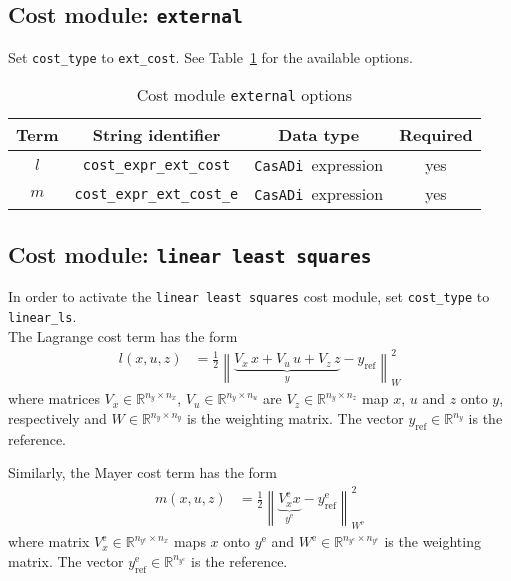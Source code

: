 \documentclass[english]{article}
\newcommand{\code}[1]{\texttt{#1}}
\newcommand{\casadi}{\texttt{CasADi}}
\newcommand{\norm}[1]{\left\lVert#1\right\rVert}
\newcommand{\ind}[1]{_{\textrm{#1}}}
\newcommand{\terminal}{^{\textrm{e}}}
\newcommand{\mandatory}{yes}
\begin{document}
\subsection{Cost module: \code{external}}\label{sec:cost:external}
%
Set \code{cost\_type} to \code{ext\_cost}. %
See Table~\ref{tab:cost:external} for the available options.
\begin{table}[ht!]
    \centering
    \caption{Cost module \code{external} options} \label{tab:cost:external}
    \begin{tabular}{cccc}
        \toprule
        Term & String identifier & Data type & Required \\ \midrule
        $ l $ & \code{cost\_expr\_ext\_cost}    & \casadi~expression   & \mandatory  \\
        $ m $ & \code{cost\_expr\_ext\_cost\_e}    & \casadi~expression  & \mandatory \\
        \bottomrule
    \end{tabular}
\end{table}
%
\subsection{Cost module: \code{linear least squares}}\label{sec:cost:linear_ls}
%
In order to activate the \code{linear least squares} cost module, set \code{cost\_type} to \code{linear\_ls}.\\
The Lagrange cost term has the form
\begin{align}
l(x, u, z) &= \frac{1}{2} \norm{ \underbrace{V_x\, x + V_u\, u + V_z\, z}_{\displaystyle y} - y\ind{ref}}_W^2 \label{eq:cost:linear_ls:l}
\end{align}
where matrices $ V_x \in \mathbb{R}^{n_y \times n_x}$, $V_u \in \mathbb{R}^{n_y \times n_u}$ are $V_z \in \mathbb{R}^{n_y \times n_z}$ map $x$, $u$ and $z$ onto $y$, respectively and $W \in \mathbb{R}^{n_y \times n_y}$ is the weighting matrix.
The vector $y\ind{ref} \in \mathbb{R}^{n_y}$ is the reference.

Similarly, the Mayer cost term has the form
\begin{align}
m(x, u, z) &= \frac{1}{2} \norm{ \underbrace{V_x\terminal x}_{\displaystyle y\terminal} - y\ind{ref}\terminal}_{W\terminal}^2 \label{eq:cost:linear_ls:m}
\end{align}
where matrix $ V\terminal_x \in \mathbb{R}^{n_{y\terminal} \times n_x}$ maps $x$ onto $y\terminal$ and $W\terminal \in \mathbb{R}^{n_{y\terminal} \times n_{y\terminal}}$ is the weighting matrix.
The vector $y\terminal_\textrm{ref} \in \mathbb{R}^{n_{y\terminal}}$ is the reference.
\end{document}

